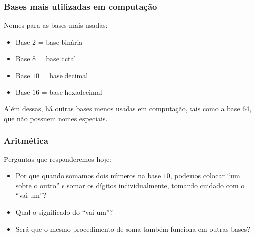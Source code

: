 \documentclass{beamer}
\begin{document}
\begin{frame}
\frametitle{Bases mais utilizadas em computação}

Nomes para as bases mais usadas:

\begin{itemize}
  \item Base $2$ = base binária
  \item Base $8$ = base octal
  \item Base $10$ = base decimal
  \item Base $16$ = base hexadecimal
\end{itemize}

Além dessas, há outras bases menos usadas em computação, tais como a base $64$,
que não possuem nomes especiais.
\end{frame}

\begin{frame}
\frametitle{Aritmética}

Perguntas que responderemos hoje:

\begin{itemize}
\item Por que quando somamos dois números na base $10$, podemos colocar ``um
sobre o outro'' e somar os dígitos individualmente, tomando cuidado com o ``vai
um''?
\item Qual o significado do ``vai um''?
\item Será que o mesmo procedimento de soma também funciona em outras bases?
\end{itemize}
\end{frame}
\end{document}
